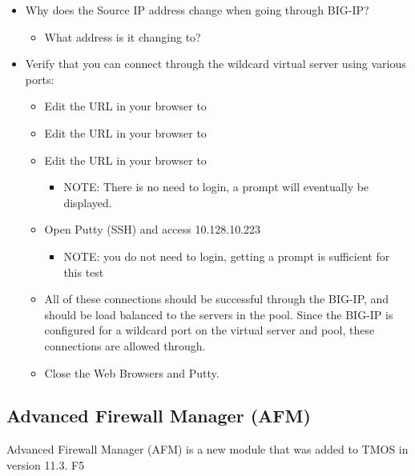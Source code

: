 \documentclass[letterpaper,10pt,english]{sphinxmanual}
\begin{document}
\begin{itemize}
\item {} 
Why does the Source IP address change when going through BIG-IP?
\begin{itemize}
\item {} 
What address is it changing to?

\end{itemize}

\item {} 
Verify that you can connect through the wildcard virtual server using
various ports:
\begin{itemize}
\item {} 
Edit the URL in your browser to

\item {} 
Edit the URL in your browser to

\item {} 
Edit the URL in your browser to
\begin{itemize}
\item {} 
NOTE: There is no need to login, a prompt will eventually be
displayed.

\end{itemize}

\item {} 
Open Putty (SSH) and access 10.128.10.223
\begin{itemize}
\item {} 
NOTE: you do not need to login, getting a prompt is sufficient
for this test

\end{itemize}

\item {} 
All of these connections should be successful through the BIG-IP,
and should be load balanced to the servers in the pool. Since the
BIG-IP is configured for a wildcard port on the virtual server and
pool, these connections are allowed through.

\item {} 
Close the Web Browsers and Putty.

\end{itemize}

\end{itemize}


\subsection{Advanced Firewall Manager (AFM)}
\label{\detokenize{class1/module1/lab2::doc}}\label{\detokenize{class1/module1/lab2:advanced-firewall-manager-afm}}
Advanced Firewall Manager (AFM) is a new module that was added to TMOS
in version 11.3. F5
\end{document}
